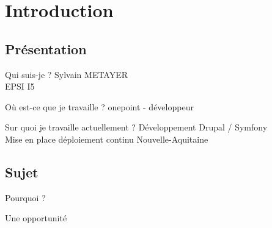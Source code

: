 \section{Introduction}

\subsection{Présentation}
\begin{frame}{\subsecname}
	\begin{block}{Qui suis-je ?}
	Sylvain METAYER \\ 
	EPSI I5 
	\end{block}
	\pause
	\begin{block}{Où est-ce que je travaille ?}
	onepoint - développeur
	\end{block}
	\pause
	\begin{block}{Sur quoi je travaille actuellement ?}
	Développement Drupal / Symfony \\ 	
	Mise en place déploiement continu Nouvelle-Aquitaine
	\end{block}
\end{frame}

\subsection{Sujet}
\begin{frame}{\subsecname}
	 \begin{overprint}
			\begin{block}{Pourquoi ?}
			\end{block}
			\begin{block}{Une opportunité}
			\end{block}
	\end{overprint} 
\end{frame}
